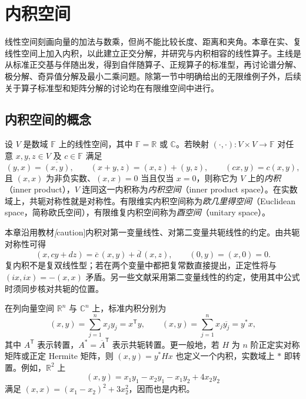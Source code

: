 \setcounter{chapter}{8} %
\chapter{内积空间}

线性空间刻画向量的加法与数乘，但尚不能比较长度、距离和夹角。本章在实、复线性空间上加入内积，以此建立正交分解，并研究与内积相容的线性算子。主线是从标准正交基与伴随出发，得到自伴随算子、正规算子的标准型，再讨论谱分解、极分解、奇异值分解及最小二乘问题。除第一节中明确给出的无限维例子外，后续关于算子标准型和矩阵分解的讨论均在有限维空间中进行。

\section{内积空间的概念}
\label{sec:inner-product-concept}

\begin{definition}
\label{def:inner-product}
设 $V$ 是数域 $\mathbb F$ 上的线性空间，其中 $\mathbb F=\mathbb R$ 或 $\mathbb C$。若映射 $(\cdot,\cdot):V\times V\to\mathbb F$ 对任意 $x,y,z\in V$ 及 $c\in\mathbb F$ 满足
\[
    (y,x)=\overline{(x,y)},\qquad
    (x+y,z)=(x,z)+(y,z),\qquad
    (cx,y)=c(x,y),
\]
且 $(x,x)$ 为非负实数、$(x,x)=0$ 当且仅当 $x=0$，则称它为 $V$ 上的\emph{内积}（inner product），$V$ 连同这一内积称为\emph{内积空间}（inner product space）。在实数域上，共轭对称性就是对称性。有限维实内积空间称为\emph{欧几里得空间}（Euclidean space，简称欧氏空间），有限维复内积空间称为\emph{酉空间}（unitary space）。
\end{definition}

本章沿用教材\emph[caution]{内积对第一变量线性、对第二变量共轭线性}的约定。由共轭对称性可得
\[
    (x,cy+dz)=\overline c\,(x,y)+\overline d\,(x,z),
    \qquad (0,y)=(x,0)=0.
\]
复内积不是复双线性型；若在两个变量中都把复常数直接提出，正定性将与 $(ix,ix)=-(x,x)$ 矛盾。另一些文献采用第二变量线性的约定，使用其中公式时须同步核对共轭的位置。

\begin{example}
\label{ex:inner-product-models}
在列向量空间 $\mathbb R^n$ 与 $\mathbb C^n$ 上，标准内积分别为
\[
    (x,y)=\sum_{j=1}^n x_jy_j=x^{\mathsf T}y,
    \qquad
    (x,y)=\sum_{j=1}^n x_j\overline{y_j}=y^*x,
\]
其中 $A^{\mathsf T}$ 表示转置，$A^*=\overline A^{\mathsf T}$ 表示共轭转置。更一般地，若 $H$ 为 $n$ 阶正定实对称矩阵或正定 Hermite 矩阵，则 $(x,y)=y^*Hx$ 也定义一个内积，实数域上 $*$ 即转置。例如，$\mathbb R^2$ 上
\[
    (x,y)=x_1y_1-x_2y_1-x_1y_2+4x_2y_2
\]
满足 $(x,x)=(x_1-x_2)^2+3x_2^2$，因而也是内积。
\end{example}


